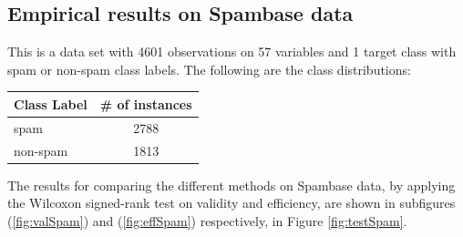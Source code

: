 \documentclass[main]{subfiles}
\begin{document}
\subsection{Empirical results on Spambase data}
This is a data set with 4601 observations on 57 variables and 1 target class with spam or non-spam class labels. The following are the class distributions:

\begin{center} 

\begin{tabular}{l|c}
Class Label & \# of instances \\
\toprule
spam &  2788\\
non-spam &  1813\\
\end{tabular}
\end{center}

The results for comparing the different methods on Spambase data, by applying the Wilcoxon signed-rank test on validity and efficiency, are shown in subfigures (\ref{fig:valSpam}) and (\ref{fig:effSpam}) respectively, in Figure \ref{fig:testSpam}.
\end{document}
